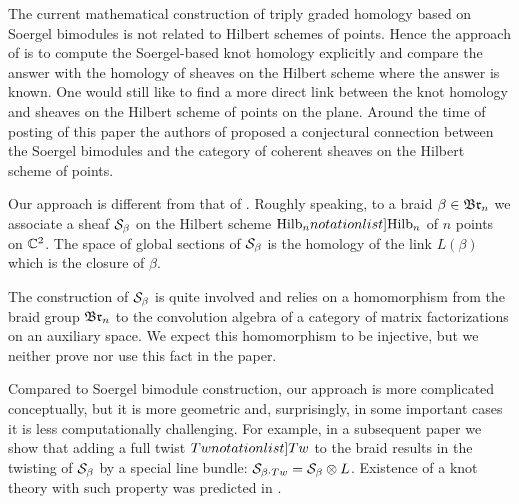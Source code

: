 \documentclass[10pt]{amsart}
\begin{document}
The current mathematical construction of triply graded homology based on Soergel bimodules is not related to Hilbert schemes of points. Hence the approach of  \cite{Ho,EHo,Me} is to compute the Soergel-based knot homology explicitly
and compare the answer with the homology of sheaves on the Hilbert scheme where the answer is known. One would still like to find a more direct link between the knot homology and sheaves on the Hilbert scheme of points on the plane.
Around the time of posting of this paper the authors of
\cite{GNR} proposed a conjectural connection between the Soergel bimodules and the category of coherent sheaves on the Hilbert scheme of points.

Our approach is different from that of \cite{GNR}. Roughly speaking, to a braid $\beta\in\mathfrak{Br}_n$ we associate a sheaf $\mathcal{S}_{\beta}$ on the Hilbert scheme $\SymbolPrint{\Hilb_n}$ of $n$ points on $\mathbb{C}^2$. The space of global sections of $\mathcal{S}_\beta$ is the homology of the link $L(\beta)$ which is the closure of $\beta$.

The construction of $\mathcal{S}_\beta$ is quite involved and relies on a homomorphism from the braid group $\mathfrak{Br}_n$ to the convolution algebra of a category of matrix factorizations on an auxiliary space. We expect this homomorphism to be injective, but we neither prove nor use this fact in the paper.
%

Compared to Soergel bimodule construction, our approach is more complicated conceptually, but it is more geometric and, surprisingly, in some important cases it is less computationally challenging.
For example, in a subsequent paper \cite{OR} we  show that adding a full twist $\SymbolPrint{Tw}$ to the braid results in the twisting of $\mathcal{S}_{\beta}$ by a special line bundle:
$\mathcal{S}_{\beta\cdot Tw}=\mathcal{S}_{\beta}\otimes L$.  Existence of a knot theory with such property was predicted in \cite{ORS}.
\end{document}
